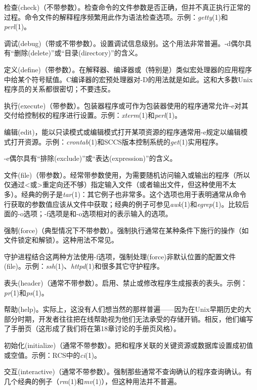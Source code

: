\documentclass[12pt,oneside]{ctexbook}
\begin{document}
\begin{common-format}
\begin{description}
检查(check)（不带参数）。检查命令的文件参数是否正确，但并不真正执行正常的过程。命令文件的解释程序频繁用此作为语法检查选项。示例：\textit{getty}(1)和\textit{perl}(1)。
\item[-d] 调试(debug)（带或不带参数）。设置调试信息级别。这个用法非常普遍。-d偶尔具有“删除(delete)”或“目录(directory)”的含义。
\item[-D] 定义(define)（带参数）。在解释器、编译器或（特别是）类似宏处理器的应用程序中给某个符号赋值。C编译器的宏预处理器对-D的用法就是如此。这和大多数Unix程序员的关系都很密切；不要违反。
\item[-e] 执行(execute)（带参数）。包装器程序或可作为包装器使用的程序通常允许-e对其交付给控制权的程序进行设置。示例：\textit{xterm}(1)和\textit{perl}(1)。

编辑(edit)，能以只读模式或编辑模式打开某项资源的程序通常用-e规定以编辑模式打开资源。示例：\textit{crontab}(1)和SCCS版本控制系统的\textit{get}(1)实用程序。

-e偶尔具有“排除(exclude)”或“表达(expression)”的含义。

\item[-f] 文件(file)（带参数）。经常带参数使用，为需要随机访问输入或输出的程序（所以仅通过<或>重定向还不够）指定输入文件（或者输出文件，但这种使用不太多）。经典的例子是\textit{tar}(1)：其它例子也非常多。这个选项也用于表明通常从命令行获取的参数值应该从文件中获取；经典的例子可参见\textit{awk}(1)和\textit{egrep}(1)。比较后面的-o选项；-f选项是和-o选项相对的表示输入的选项。

强制(force)（典型情况下不带参数）。强制执行通常在某种条件下施行的操作（如文件锁定和解锁）。这种用法不常见。

守护进程结合这两种方法使用-f选项，强制处理(force)非默认位置的配置文件(file)。示例：\textit{ssh}(1)、\textit{httpd}(1)和很多其它守护程序。

\item[-h] 表头(header)（通常不带参数）。启用、禁止或修改程序生成报表的表头。示例：\textit{pr}(1)和\textit{ps}(1)。

帮助(help)。实际上，这没有人们想当然的那样普遍——因为在Unix早期历史的大部分时期，开发者往往把在线帮助视为他们无法承受的存储开销。相反，他们编写了手册页（这形成了我们将在第18章讨论的手册页风格）。

\item[-i] 初始化(initialize)（通常不带参数）。把和程序关联的关键资源或数据库设置成初值或空值。示例：RCS中的\textit{ci}(1)。

交互(interactive)（通常不带参数）。强制那些通常不查询确认的程序查询确认。有几个经典的例子（\textit{rm}(1)和\textit{mv}(1)），但这种用法并不普遍。


\end{description}
\end{common-format}
\end{document}
